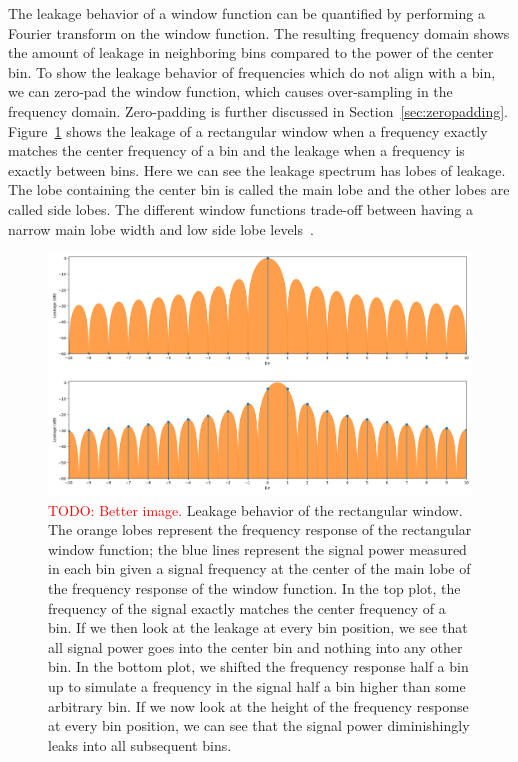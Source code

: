 \documentclass[10pt,twocolumn]{article}
\begin{document}
The leakage behavior of a window function can be quantified by performing a Fourier transform on the window function. The resulting frequency domain shows the amount of leakage in neighboring bins compared to the power of the center bin. To show the leakage behavior of frequencies which do not align with a bin, we can zero-pad the window function, which causes over-sampling in the frequency domain. Zero-padding is further discussed in Section~\ref{sec:zeropadding}. Figure~\ref{fig:winleak} shows the leakage of a rectangular window when a frequency exactly matches the center frequency of a bin and the leakage when a frequency is exactly between bins. Here we can see the leakage spectrum has lobes of leakage. The lobe containing the center bin is called the main lobe and the other lobes are called side lobes. The different window functions trade-off between having a narrow main lobe width and low side lobe levels~\cite{windowfunc}.
\begin{figure}[b]
    \centering
    \includegraphics[width=\linewidth]{fig/winleak.png}
    \caption{\textcolor{red}{TODO: Better image.} Leakage behavior of the rectangular window. The orange lobes represent the frequency response of the rectangular window function; the blue lines represent the signal power measured in each bin given a signal frequency at the center of the main lobe of the frequency response of the window function. In the top plot, the frequency of the signal exactly matches the center frequency of a bin. If we then look at the leakage at every bin position, we see that all signal power goes into the center bin and nothing into any other bin. In the bottom plot, we shifted the frequency response half a bin up to simulate a frequency in the signal half a bin higher than some arbitrary bin. If we now look at the height of the frequency response at every bin position, we can see that the signal power diminishingly leaks into all subsequent bins.}
    \label{fig:winleak}
\end{figure}
\end{document}
